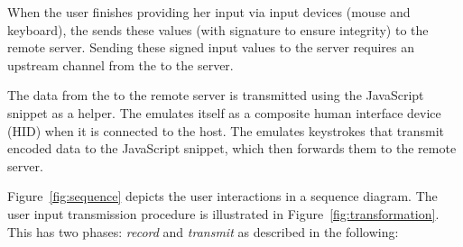When the user finishes providing her input via input devices (mouse and keyboard), the \device sends these values (with signature to ensure integrity) to the remote server. Sending these signed input values to the server requires an upstream channel from the \device to the server. 

\label{sec:systemDesign:commit:upload} 
The data from the \device to the remote server is transmitted using the \name JavaScript snippet as a helper. 
The \device emulates itself as a composite human interface device (HID) when it is connected to the host. The \device emulates keystrokes that transmit encoded data to the \name JavaScript snippet, which then forwards them to the remote server.

 Figure~\ref{fig:sequence} depicts the user interactions in a sequence diagram. The user input transmission procedure is illustrated in Figure~\ref{fig:transformation}. This has two phases: \emph{record} and \emph{transmit} as described in the following:

